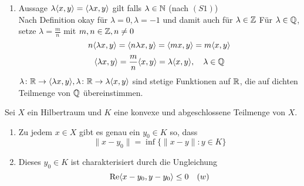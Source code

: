 \begin{beweis}
\begin{enumerate}[label=\roman*\upshape)]
		\item Aussage $\lambda \langle x, y \rangle = \langle \lambda x, y \rangle$ gilt falls $\lambda \in \mathbb{N}$ (nach \hyperref[def:15.1i]{$(S1)$}) \\
			Nach Definition okay für $\lambda = 0, \lambda = -1$ und damit auch für $\lambda \in \mathbb{Z}$
			Für $\lambda \in \mathbb{Q}$, setze $\lambda = \frac{m}{n}$ mit $m, n \in \mathbb{Z}, n \neq 0$ 
			\[ n \langle \lambda x, y \rangle = \langle n \lambda x, y \rangle = \langle m x, y \rangle = m \langle x, y \rangle \]
			\[ \langle \lambda x, y \rangle = \frac{m}{n} \langle x, y \rangle = \lambda \langle x, y \rangle, \quad \lambda \in \mathbb{Q} \]
			$\lambda \colon \mathbb{R} \rightarrow \langle \lambda x, y \rangle, \lambda \colon \mathbb{R} \rightarrow \lambda \langle x, y \rangle$ sind stetige Funktionen auf $\mathbb{R}$, die auf dichten Teilmenge von $\mathbb{Q}$ übereinstimmen.
	\end{enumerate}
\end{beweis}


\begin{satz} \label{satz:15.7-besteApproximation} 
	Sei $X$ ein Hilbertraum und $K$ eine konvexe und abgeschlossene Teilmenge von $X$.
	\begin{enumerate}[label=\alph*\upshape)]
		\item Zu jedem $x \in X$ gibt es genau ein $y_{0} \in K$ so, dass
			\[ \| x - y_{0} \| = \inf \{ \| x - y \|: y \in K \} \]
		\item Dieses $y_{0} \in K$ ist charakterisiert durch die Ungleichung 
			\[ \mathop{\rm Re}\nolimits \langle x - y_{0}, y - y_{0} \rangle \leq 0 \quad (w) \label{eq:15.7.5-SkalarproductbestApproximation} \]
	\end{enumerate}
\end{satz}

